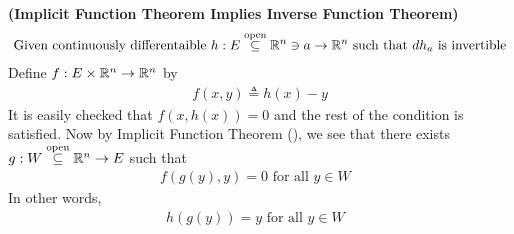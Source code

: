 \documentclass{report}
\begin{document}
\begin{Example}{\textbf{(Implicit Function Theorem Implies Inverse Function Theorem)}}{}
\begin{align*}
\text{ Given continuously differentaible }h:E\overset{\text{open}}{\subseteq}\mathbb{R}^n\ni a\rightarrow \mathbb{R}^n\text{ such that }dh_a\text{ is invertible }
\end{align*}
Define $f:E\times \mathbb{R}^n\rightarrow \mathbb{R}^n$ by 
\begin{align*}
f(x,y)\triangleq h(x)-y
\end{align*}
It is easily checked that $f(x,h(x))=0$  and the rest of the condition is satisfied. Now by Implicit Function Theorem (), we see that there exists $g:W\overset{\text{open}}{\subseteq}\mathbb{R}^n \rightarrow E$ such that 
\begin{align*}
f(g(y),y)=0\text{ for all $y\in W$ }
\end{align*}
In other words, 
\begin{align*}
h(g(y))=y\text{ for all $y \in W$ }
\end{align*}
\end{Example}
\end{document}
